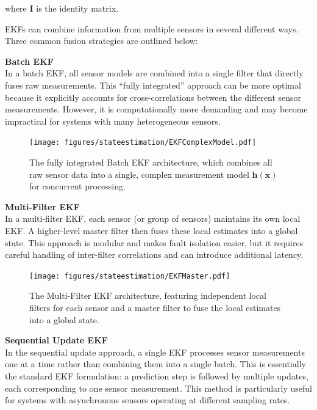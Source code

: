 \noindent
where \(\mathbf{I}\) is the identity matrix.

\label{sec:MSE}

EKFs can combine information from multiple sensors in several different ways. Three common fusion strategies are outlined below:
\vspace{0.5cm}

\noindent
\textbf{Batch EKF}\\
In a batch EKF, all sensor models are combined into a single filter that directly fuses raw measurements. This “fully integrated” approach can be 
more optimal because it explicitly accounts for cross-correlations between the different sensor measurements. However, it is computationally more 
demanding and may become impractical for systems with many heterogeneous sensors.

\begin{figure}[H]
    \centering
    \texttt{[image: figures/stateestimation/EKFComplexModel.pdf]}
    \caption{The fully integrated Batch EKF architecture, which combines all raw sensor data into a single, complex measurement model $\mathbf{h}(\mathbf{x})$ for concurrent processing.}
    \label{fig:EKFCM}
\end{figure}

\noindent
\textbf{Multi-Filter EKF}\\
In a multi-filter EKF, each sensor (or group of sensors) maintains its own local EKF. A higher-level master filter then fuses these local estimates 
into a global state. This approach is modular and makes fault isolation easier, but it requires careful handling of inter-filter correlations and can 
introduce additional latency.

\begin{figure}[H]
    \centering
    \texttt{[image: figures/stateestimation/EKFMaster.pdf]}
    \caption{The Multi-Filter EKF architecture, featuring independent local filters for each sensor and a master filter to fuse the local estimates into a global state.}
    \label{fig:EKFM}
\end{figure}

\noindent
\textbf{Sequential Update EKF}\\
In the sequential update approach, a single EKF processes sensor measurements one at a time rather than combining them into a single batch. 
This is essentially the standard EKF formulation: a prediction step is followed by multiple updates, each corresponding to one sensor measurement. 
This method is particularly useful for systems with asynchronous sensors operating at different sampling rates.

